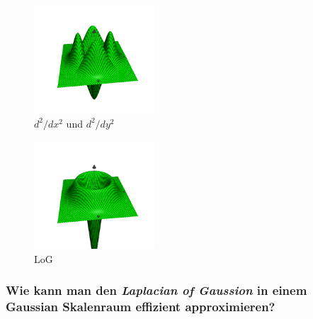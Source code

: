 \begin{figure}[p] %
   \centering
   \includegraphics[width=0.4\textwidth]{Uebung6/2Abl_xy.pdf} 
   \caption{$d^{2}/dx^{2}$ und $d^{2}/dy^{2}$}
   \label{fig:2Abl}
\end{figure}

\begin{figure}[p] %
   \centering
   \includegraphics[width=0.4\textwidth]{Uebung6/LoG.pdf} 
   \caption{LoG}
   \label{fig:LoG}
\end{figure}

\subsubsection*{Wie kann man den \emph{Laplacian of Gaussion} in einem Gaussian Skalenraum effizient approximieren?}
